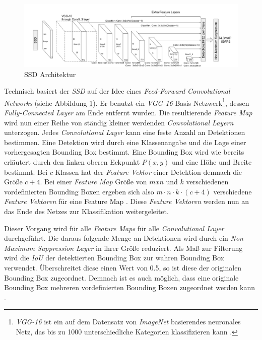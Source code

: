 \begin{figure}[ht]
	\begin{center}
		\includegraphics[width=15cm]{Bilder/ssd_architecture.png} 
		\caption[SSD Architektur]{SSD Architektur \cite{ssd.20161229}}
		\label{architecture}
	\end{center}
\end{figure}

Technisch basiert der \textit{SSD} auf der Idee eines \textit{Feed-Forward Convolutional Networks} (siehe Abbildung \ref{architecture}). Er benutzt ein \textit{VGG-16} Basis Netzwerk\footnote{\textit{VGG-16} ist ein auf dem Datensatz von \textit{ImageNet} basierendes neuronales Netz, das bis zu 1000 unterschiedliche Kategorien klassifizieren kann \cite{MathWorks.2019b}.}, dessen \textit{Fully-Connected Layer} am Ende entfernt wurden. Die resultierende \textit{Feature Map} wird nun einer Reihe von ständig kleiner werdenden \textit{Convolutional Layern} unterzogen. Jedes \textit{Convolutional Layer} kann eine feste Anzahl an Detektionen bestimmen. Eine Detektion wird durch eine Klassenangabe und die Lage einer vorhergesagten Bounding Box bestimmt. Eine Bounding Box wird wie bereits erläutert durch den linken oberen Eckpunkt $P(x,y)$ und eine Höhe und Breite bestimmt. Bei $c$ Klassen hat der \textit{Feature Vektor} einer Detektion demnach die Größe $c+4$. Bei einer \textit{Feature Map} Größe von $m x n$ und $k$ verschiedenen vordefinierten Bounding Boxen ergeben sich also $m \cdot n \cdot k \cdot (c+4)$ verschiedene \textit{Feature Vektoren} für eine Feature Map \cite{ssd.20161229}. Diese \textit{Feature Vektoren} werden nun an das Ende des Netzes zur Klassifikation weitergeleitet.

Dieser Vorgang wird für alle \textit{Feature Maps} für alle \textit{Convolutional Layer} durchgeführt. Die daraus folgende Menge an Detektionen wird durch ein \textit{Non Maximum Suppression Layer} in ihrer Größe reduziert. Als Maß zur Filterung wird die \textit{IoU} der detektierten Bounding Box zur wahren Bounding Box verwendet. Überschreitet diese einen Wert von 0.5, so ist diese der originalen Bounding Box zugeordnet. Demnach ist es auch möglich, dass eine originale Bounding Box mehreren vordefinierten Bounding Boxen zugeordnet werden kann \cite{ssd.20161229}.

